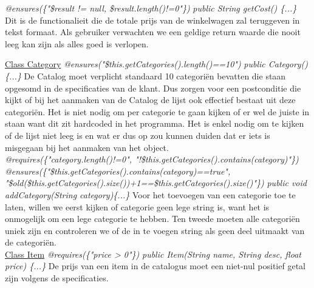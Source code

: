 \documentclass{article}
\begin{document}
\noindent
\textit{@ensures(\{"\$result != null, \$result.length()!=0"\})}\newline
\textit{public String getCost() \{...\}}\newline
Dit is de functionalieit die de totale prijs van de winkelwagen zal teruggeven in tekst formaat. Als gebruiker verwachten we een geldige return waarde die nooit leeg kan zijn als alles goed is verlopen.\\

\newpage

\noindent
\underline{Class Category}\newline
\textit{@ensures("\$this.getCategories().length()==10")}\newline
\textit{public Category()\{...\}}\newline
De Catalog moet verplicht standaard 10 categori\"{e}n bevatten die staan opgesomd in de specificaties van de klant. Dus zorgen voor een postconditie die kijkt of bij het aanmaken van de Catalog de lijst ook effectief bestaat uit deze categori\"{e}n. Het is niet nodig om per categorie te gaan kijken of er wel de juiste in staan want dit zit hardcoded in het programma. Het is enkel nodig om te kijken of de lijst niet leeg is en wat er dus op zou kunnen duiden dat er iets is misgegaan bij het aanmaken van het object.\\

\noindent
\textit{@requires(\{"category.length()!=0", "!\$this.getCategories().contains(category)"\})}\newline
\textit{@ensures(\{"\$this.getCategories().contains(category)==true", "\$old(\$this.getCategories().size())+1==\$this.getCategories().size()"\})}\newline
\textit{public void addCategory(String category)\{...\}}\newline
Voor het toevoegen van een categorie toe te laten, willen we eerst kijken of categorie geen lege string is, want het is onmogelijk om een lege categorie te hebben. Ten tweede moeten alle categori\"{e}n uniek zijn en controleren we of de in te voegen string als geen deel uitmaakt van de categori\"{e}n. \\

\noindent
\underline{Class Item}\newline
\textit{@requires(\{"price > 0"\})}\newline
\textit{public Item(String name, String desc, float price) \{...\}}\newline
De prijs van een item in de catalogus moet een niet-nul positief getal zijn volgens de specificaties.
\end{document}

